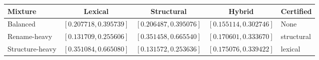 \begin{tabular}{@{}lcccl@{}}
\toprule
Mixture & Lexical & Structural & Hybrid & Certified \\
\midrule
Balanced & $[0.207718,0.395739]$ & $[0.206487,0.395076]$ & $[0.155114,0.302746]$ & None \\
Rename-heavy & $[0.131709,0.255606]$ & $[0.351458,0.665540]$ & $[0.170601,0.333670]$ & structural \\
Structure-heavy & $[0.351084,0.665080]$ & $[0.131572,0.253636]$ & $[0.175076,0.339422]$ & lexical \\
\bottomrule
\end{tabular}
